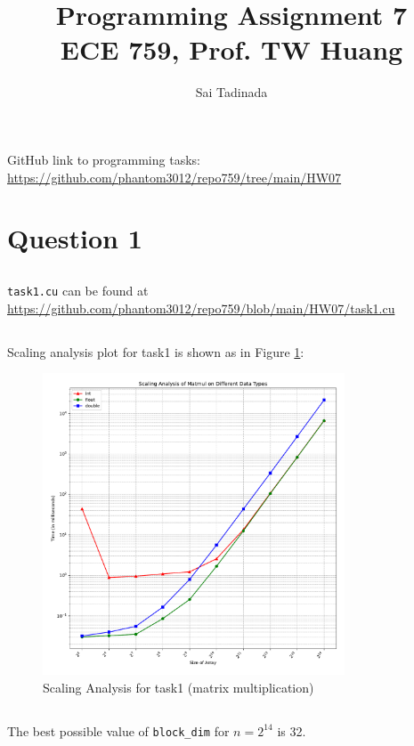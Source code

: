 \documentclass[12pt]{article}
\title{Programming Assignment 7 \\ \small{ECE 759, Prof. TW Huang}}
\author{Sai Tadinada}
\date{}
\begin{document}
\maketitle

GitHub link to programming tasks: \\ \url{https://github.com/phantom3012/repo759/tree/main/HW07}

\section{Question 1}

\subsection{}
\texttt{task1.cu} can be found at \url{https://github.com/phantom3012/repo759/blob/main/HW07/task1.cu}

\subsection{}
Scaling analysis plot for task1 is shown as in Figure \ref{fig:task1}:
\begin{figure}[ht]
    \centering
    \includegraphics[width=0.8\textwidth]{task1.pdf}
    \caption{Scaling Analysis for task1 (matrix multiplication)}
    \label{fig:task1}
\end{figure}

\subsection{} %
The best possible value of \texttt{block\_dim} for $n = 2^{14}$ is 32.
\end{document}
